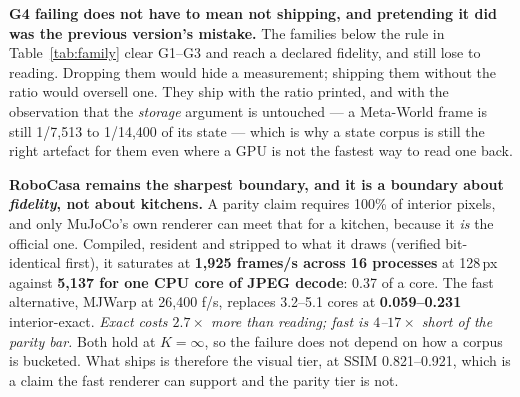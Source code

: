\documentclass{article}
\begin{document}
\textbf{G4 failing does not have to mean not shipping, and pretending it did
was the previous version's mistake.} The \seNfamBelow{} families below the rule
in Table~\ref{tab:family} clear G1--G3 and reach a declared fidelity, and still
lose to reading. Dropping them would hide a measurement; shipping them without
the ratio would oversell one. They ship with the ratio printed, and with the
observation that the \emph{storage} argument is untouched --- a Meta-World frame
is still 1/7,513 to 1/14,400 of its state --- which is why a state corpus is
still the right artefact for them even where a GPU is not the fastest way to
read one back.

\textbf{RoboCasa remains the sharpest boundary, and it is a boundary about
\emph{fidelity}, not about kitchens.} A parity claim requires 100\% of interior
pixels, and only MuJoCo's own renderer can meet that for a kitchen, because it
\emph{is} the official one. Compiled, resident and stripped to what it draws
(verified bit-identical first), it saturates at \textbf{1,925 frames/s across
16 processes} at 128\,px against \textbf{5,137 for one CPU core of JPEG
decode}: 0.37 of a core. The fast alternative, MJWarp at 26,400 f/s, replaces
3.2--5.1 cores at \textbf{0.059--0.231} interior-exact. \emph{Exact costs
$2.7\times$ more than reading; fast is $4$--$17\times$ short of the parity
bar.} Both hold at $K = \infty$, so the failure does not depend on how a corpus
is bucketed. What ships is therefore the visual tier, at SSIM 0.821--0.921,
which is a claim the fast renderer can support and the parity tier is not.
\end{document}
